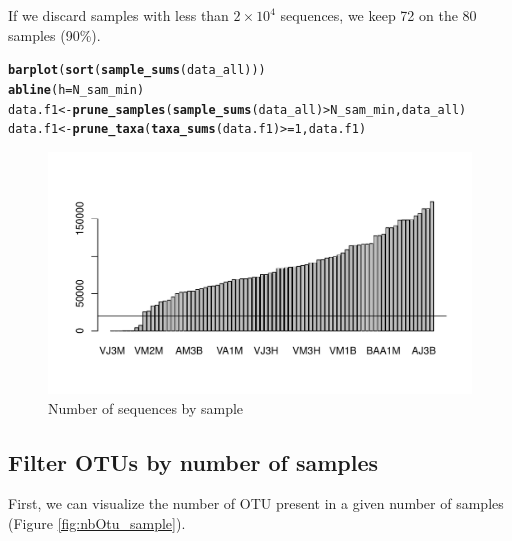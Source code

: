 \documentclass[12pt]{article}\usepackage[]{graphicx}\usepackage[]{color}
\makeatletter
\def\maxwidth{ %
  \ifdim\Gin@nat@width>\linewidth
    \linewidth
  \else
    \Gin@nat@width
  \fi
}
\newcommand{\hlnum}[1]{\textcolor[rgb]{0.686,0.059,0.569}{#1}}%
\newcommand{\hlopt}[1]{\textcolor[rgb]{0,0,0}{#1}}%
\newcommand{\hlstd}[1]{\textcolor[rgb]{0.345,0.345,0.345}{#1}}%
\newcommand{\hlkwb}[1]{\textcolor[rgb]{0.69,0.353,0.396}{#1}}%
\newcommand{\hlkwc}[1]{\textcolor[rgb]{0.333,0.667,0.333}{#1}}%
\newcommand{\hlkwd}[1]{\textcolor[rgb]{0.737,0.353,0.396}{\textbf{#1}}}%
\newenvironment{kframe}{%
 \def\at@end@of@kframe{}%
 \ifinner\ifhmode%
  \def\at@end@of@kframe{\end{minipage}}%
  \begin{minipage}{\columnwidth}%
 \fi\fi%
 \def\FrameCommand##1{\hskip\@totalleftmargin \hskip-\fboxsep
 \colorbox{shadecolor}{##1}\hskip-\fboxsep
     \hskip-\linewidth \hskip-\@totalleftmargin \hskip\columnwidth}%
 \MakeFramed {\advance\hsize-\width
   \@totalleftmargin\z@ \linewidth\hsize
   \@setminipage}}%
 {\par\unskip\endMakeFramed%
 \at@end@of@kframe}
\newenvironment{knitrout}{}{} %
\numberwithin{figure}{section}
\makeatother
\begin{document}
If we discard samples with less than \ensuremath{2\times 10^{4}} sequences, we keep 72 on the 80 samples (90\%).

\begin{knitrout}\small
{}\color{fgcolor}\begin{kframe}
\begin{alltt}
\hlkwd{barplot}\hlstd{(}\hlkwd{sort}\hlstd{(}\hlkwd{sample_sums}\hlstd{(data_all)))}
\hlkwd{abline}\hlstd{(}\hlkwc{h} \hlstd{= N_sam_min)}
\hlstd{data.f1} \hlkwb{<-} \hlkwd{prune_samples}\hlstd{(}\hlkwd{sample_sums}\hlstd{(data_all)} \hlopt{>} \hlstd{N_sam_min, data_all)}
\hlstd{data.f1} \hlkwb{<-} \hlkwd{prune_taxa}\hlstd{(}\hlkwd{taxa_sums}\hlstd{(data.f1)} \hlopt{>=}  \hlnum{1}\hlstd{, data.f1)}
\end{alltt}
\end{kframe}\begin{figure}

{\centering \includegraphics[width=\maxwidth]{figure/unnamed-chunk-12-1} 

}

\caption[Number of sequences by sample]{Number of sequences by sample}\label{fig:unnamed-chunk-12}
\end{figure}


\end{knitrout}

  \subsection{Filter OTUs by number of samples}

First, we can visualize the number of OTU present in a given number of samples (Figure \ref{fig:nbOtu_sample}).
\end{document}
